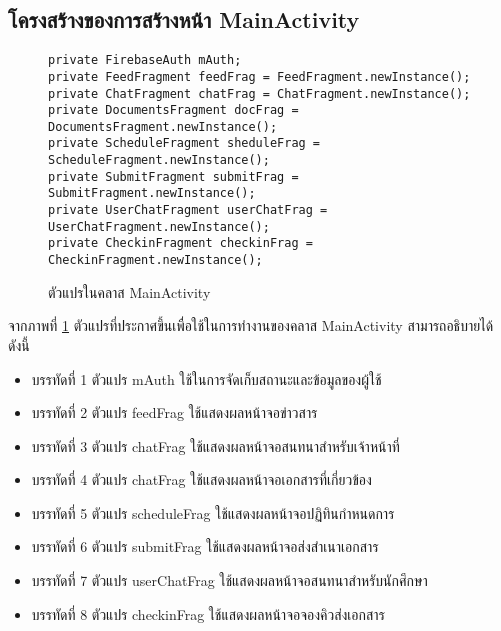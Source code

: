 	\subsection{โครงสร้างของการสร้างหน้า MainActivity}
		\begin{figure}[H]
			{\begin{lstlisting}
private FirebaseAuth mAuth;
private FeedFragment feedFrag = FeedFragment.newInstance();
private ChatFragment chatFrag = ChatFragment.newInstance();
private DocumentsFragment docFrag = DocumentsFragment.newInstance();
private ScheduleFragment sheduleFrag = ScheduleFragment.newInstance();
private SubmitFragment submitFrag = SubmitFragment.newInstance();
private UserChatFragment userChatFrag = UserChatFragment.newInstance();
private CheckinFragment checkinFrag = CheckinFragment.newInstance();
				\end{lstlisting}}
			\caption{ตัวแปรในคลาส MainActivity}
			\label{Fig:MainActivity}
		\end{figure}
		จากภาพที่ \ref{Fig:MainActivity} ตัวแปรที่ประกาศขึ้นเพื่อใช้ในการทำงานของคลาส MainActivity สามารถอธิบายได้ดังนี้
		\begin{itemize}[label={--}]
			\item บรรทัดที่ 1 ตัวแปร mAuth ใช้ในการจัดเก็บสถานะและข้อมูลของผู้ใช้
			\item บรรทัดที่ 2 ตัวแปร feedFrag ใช้แสดงผลหน้าจอข่าวสาร  
			\item บรรทัดที่ 3 ตัวแปร chatFrag ใช้แสดงผลหน้าจอสนทนาสำหรับเจ้าหน้าที่
			\item บรรทัดที่ 4 ตัวแปร chatFrag ใช้แสดงผลหน้าจอเอกสารที่เกี่ยวข้อง
			\item บรรทัดที่ 5 ตัวแปร scheduleFrag ใช้แสดงผลหน้าจอปฏิทินกำหนดการ
			\item บรรทัดที่ 6 ตัวแปร submitFrag ใช้แสดงผลหน้าจอส่งสำเนาเอกสาร 
			\item บรรทัดที่ 7 ตัวแปร userChatFrag ใช้แสดงผลหน้าจอสนทนาสำหรับนักศึกษา
			\item บรรทัดที่ 8 ตัวแปร checkinFrag ใช้แสดงผลหน้าจอจองคิวส่งเอกสาร
		\end{itemize}
